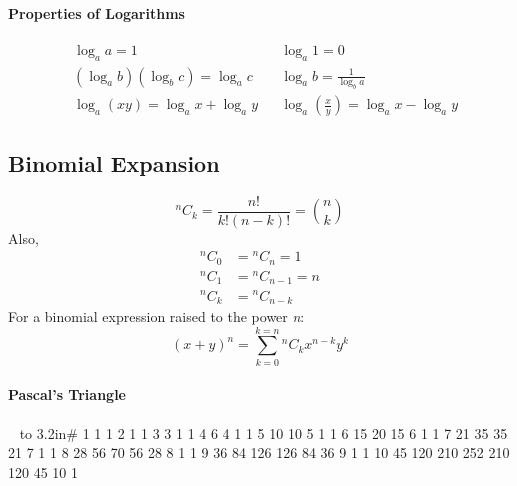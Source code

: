 \documentclass[12pt]{article}
\begin{document}
\paragraph{Properties of Logarithms}
\begin{align*}
&\log_aa  = 1 &   &\log_a1 = 0 \\  
&(\log_ab)(\log_bc) = \log_ac & &\log_ab = \frac{1}{\log_ba} \\ 
&\log_a(xy) = \log_ax + \log_ay &
&\log_a\left(\frac{x}{y}\right) = \log_ax - \log_ay
\end{align*}


\subsection{Binomial Expansion}
$$^nC_k = \frac{n!}{k!(n-k)!} = {n\choose k} $$
Also,
\begin{align*}
	{^nC_0} &= {^nC_n} = 1 \\
	{^nC_1} &= {^nC_{n-1}} = n \\
	{^nC_k} &= {^nC_{n-k}}
\end{align*}
For a binomial expression raised to the power \emph{n}:
$${(x+y)}^n  = \sum_{k=0}^{k=n} {^nC_k} x^{n-k}y^k$$
\paragraph{Pascal's Triangle}
\begin{center}
	~
\vbox{\offinterlineskip 
	\halign to 3.2in{\quad\hfil#\hfil{} \cr\noalign{\vskip 1 mm}
		1\hskip5.010mm 1 \cr\noalign{\vskip 1 mm}
		1\hskip5.015mm 2\hskip5.015mm 1 \cr\noalign{\vskip 1 mm}
		1\hskip5.025mm 3\hskip5.025mm 3\hskip5.025mm 1 \cr\noalign{\vskip 1 mm}
		1\hskip5.05mm 4\hskip5.05mm 6\hskip5.05mm 4\hskip5.05mm 1 \cr\noalign{\vskip 1.5 mm}
		1\hskip5mm 5\hskip5mm 10\hskip5mm 10\hskip5mm 5\hskip5mm 1 \cr\noalign{\vskip 1.5 mm}
		1\hskip4.90mm 6\hskip4.90mm 15\hskip4.90mm 20\hskip4.90mm 15\hskip4.90mm 6\hskip4.90mm 1 \cr\noalign{\vskip 1.5 mm}
		1\hskip4.75mm 7\hskip4.75mm 21\hskip4.75mm 35\hskip4.75mm 35\hskip4.75mm 21\hskip4.75mm 7\hskip4.75mm 1 \cr\noalign{\vskip 1.5 mm}
		1\hskip4.5mm 8\hskip4.5mm 28\hskip4.5mm 56\hskip4.5mm 70\hskip4.5mm 56\hskip4.5mm 28\hskip4.5mm 8\hskip4.5mm 1 \cr\noalign{\vskip 1.5 mm}
		1\hskip4mm 9\hskip4mm 36\hskip4mm 84\hskip4mm 126\hskip4mm 126\hskip4mm 84\hskip4mm 36\hskip4mm 9\hskip4mm 1 \cr\noalign{\vskip 1.5 mm}
		1\hskip3mm 10\hskip3mm 45\hskip3mm 120\hskip3mm 210\hskip3mm 252\hskip3mm 210\hskip3mm 120\hskip3mm 45\hskip3mm 10\hskip3mm 1 \cr\noalign{\vskip 1.5 mm}
	}
}
\end{center}
\end{document}

